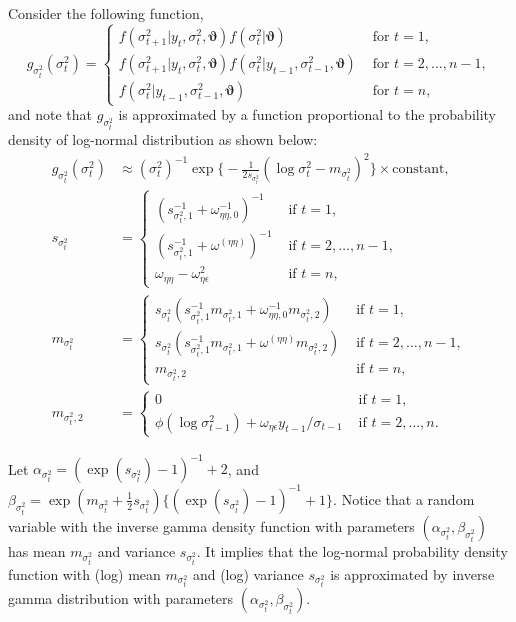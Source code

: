 \documentclass[11pt]{article}
\begin{document}
Consider the following function,  
\begin{equation}
g_{\sigma^2_t}(\sigma^2_{t}) 
= \begin{cases}
f(\sigma^2_{t+1} |y_t, \sigma^2_{t}, \bm{\vartheta})f(\sigma^2_{t} |\bm{\vartheta})
& \text{ for } t=1, \\
f(\sigma^2_{t+1} |y_t, \sigma^2_{t}, \bm{\vartheta})f(\sigma^2_{t} |y_{t-1}, \sigma^2_{t-1}, \bm{\vartheta})
& \text{ for } t=2, \ldots, n-1, \\
f(\sigma^2_{t} |y_{t-1}, \sigma^2_{t-1}, \bm{\vartheta}) 
& \text{ for } t=n, \end{cases}
\end{equation}
and note that $g_{\sigma^2_t}$ is approximated by a function proportional to the probability density of log-normal distribution as shown below: 
\begin{align}
g_{\sigma^2_t}(\sigma^2_{t} ) 
&\approx (\sigma^2_t)^{-1} \exp \bigg\{ -\frac{1}{2s_{\sigma^2_t}}(\log\sigma^2_t -m_{\sigma^2_t})^2 \bigg\} \times\text{constant}, \\
s_{\sigma^2_t} &=\begin{cases}
(s_{\sigma^2_t, 1}^{-1} +\omega_{\eta\eta,0}^{-1})^{-1} & \text{ if } t=1, \\
(s_{\sigma^2_t, 1}^{-1} +\omega^{(\eta\eta)})^{-1} & \text{ if } t=2, \ldots, n-1, \\
\omega_{\eta\eta} -\omega_{\eta\epsilon}^2 & \text{ if } t=n, 
\end{cases} \\
m_{\sigma^2_t} &=\begin{cases}
s_{\sigma^2_t}(s_{\sigma^2_t,1}^{-1}m_{\sigma^2_t,1} +\omega_{\eta\eta,0}^{-1}m_{\sigma^2_t,2}) & \text{ if } t=1, \\
s_{\sigma^2_t}(s_{\sigma^2_t,1}^{-1}m_{\sigma^2_t,1} +\omega^{(\eta\eta)}m_{\sigma^2_t,2}) & \text{ if } t=2, \ldots, n-1, \\
m_{\sigma^2_t,2} & \text{ if } t=n, 
\end{cases} \\
m_{\sigma^2_t, 2} &=\begin{cases}
0 & \text{ if } t=1, \\
 \phi (\log\sigma^2_{t-1}) +\omega_{\eta\epsilon} y_{t-1}/\sigma_{t-1} & \text{ if } t=2, \ldots, n. 
\end{cases}
\end{align}

Let $\alpha_{\sigma^2_t} =(\exp(s_{\sigma^2_t})-1)^{-1}+2$, and $\beta_{\sigma^2_t} =\exp(m_{\sigma^2_t}+\frac{1}{2}s_{\sigma^2_t}) \{(\exp(s_{\sigma^2_t})-1)^{-1}+1\}$. 
Notice that a random variable with the inverse gamma density function with parameters $(\alpha_{\sigma^2_t}, \beta_{\sigma^2_t})$ 
has mean $m_{\sigma^2_t}$ and variance $s_{\sigma^2_t}$.
It implies that the log-normal probability density function with (log) mean $m_{\sigma^2_t}$ and (log) variance $s_{\sigma^2_t}$ is approximated by inverse gamma distribution with parameters $(\alpha_{\sigma^2_t}, \beta_{\sigma^2_t})$.
\end{document}
